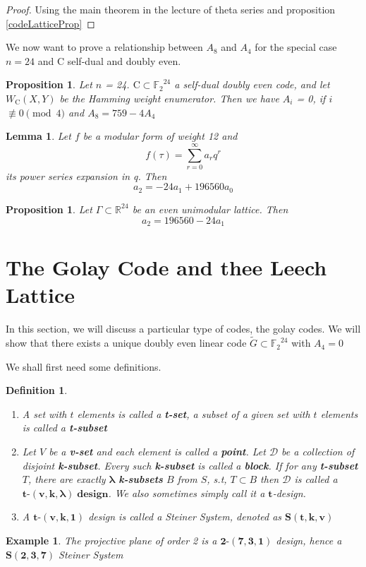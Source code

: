 \documentclass{article}
\newtheorem{lemma}[theorem]{Lemma}
\newtheorem{definition}[theorem]{Definition}
\newtheorem{example}[theorem]{Example}
\newtheorem{prop}[theorem]{Proposition}
\numberwithin{equation}{theorem}
\numberwithin{figure}{theorem}
\newcommand{\GExtend}{\ensuremath{\widetilde{G}}}
\newcommand{\Ftwo}{\ensuremath{\mathbb{F}_2}}
\newcommand{\tCompleteDesign}{\ensuremath{\bm{t\mbox{-}(v,k,\lambda)\; design}}}
\newcommand{\simpleCodes}{\ensuremath{\mathrm{C}}}
\newcommand{\weightEnumerator}[3]{\ensuremath{W_{#1}(#2,#3)}}
\newcommand{\Real}{\ensuremath{\mathbb{R}}}
\begin{document}
\begin{proof}
Using the main theorem in the lecture of theta series and proposition \ref{codeLatticeProp}
\end{proof}
We now want to prove a relationship between $A_8$ and $A_4$ for the special case $n = 24$ and $\simpleCodes$ self-dual and doubly even.
\begin{prop}\label{A8A4}
Let $n$ = 24. $\simpleCodes \subset \Ftwo^{24}$ a self-dual doubly even code, and let {\weightEnumerator{\simpleCodes}{X}{Y}} be the Hamming weight enumerator. Then we have $A_i$ = 0, if $i$ $\not\equiv 0 \pmod 4$ and $A_8 = 759 - 4 A_4$
\end{prop}
\begin{lemma}\label{a2a0a1}
Let $f$ be a modular form of weight 12 and
\[
	f(\tau) = \sum_{r = 0}^{\infty}a_rq^r
\]
its power series expansion in q. Then
\[
	a_2 = -24a_1 + 196560a_0
\]
\end{lemma}
\begin{prop}\label{a2a1}
Let $\Gamma \subset \Real^24$ be an even unimodular lattice. Then 
\[
	a_2 = 196560 - 24a_1
\] 
\end{prop}
\newpage
\section{The Golay Code and thee Leech Lattice}
In this section, we will discuss a particular type of codes, the golay codes. We will show that there exists a unique doubly even linear code  $\GExtend \subset \Ftwo^{24}$ with $A_4 = 0$ 

We shall first need some definitions.
\begin{definition}\label{designDef} \hfill
	\begin{enumerate}
		\item A set with $t$ elements is called a \textbf{t-set}, a subset of a given set with $t$ elements is called a \textbf{t-subset}
		\item Let $V$ be a \textbf{v-set} and each element is called a \textbf{point}. Let $\mathscr{D}$ be a collection of disjoint \textbf{k-subset}. Every such \textbf{k-subset} is called a \textbf{block}. If for any \textbf{t-subset} $T$, there are exactly $\mathbf{\lambda}$ \textbf{k-subsets} $B$ from $S$, s.t, $T \subset B$ then $\mathscr{D}$ is called a \tCompleteDesign . We also sometimes simply call it a $\bm{t}$-design.
		\item A $\bm{t\mbox{-}(v,k,1)}$ design is called a \emph{Steiner System}, denoted as $\bm{S(t,k,v)}$
	\end{enumerate}
\end{definition}
\begin{example}\label{projPlane}
		The projective plane of order 2 is a $\bm{2\mbox{-}(7,3,1)}$ design, hence a $\bm{S(2,3,7)}$ \emph{Steiner System}
\end{example}
\end{document}
